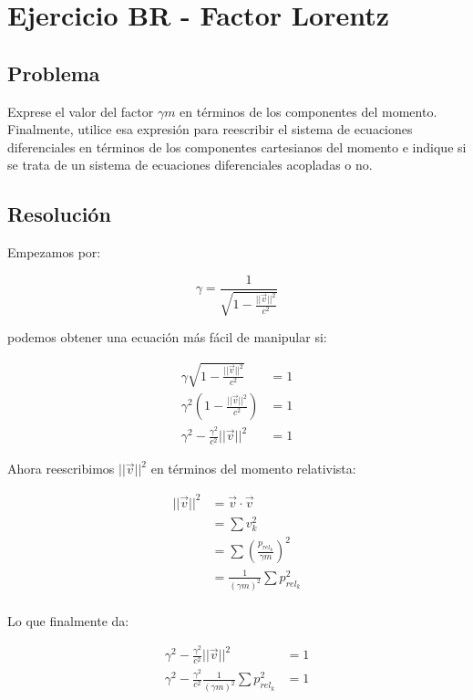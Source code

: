 \section{Ejercicio BR - Factor Lorentz}

\subsection{Problema}
Exprese el valor del factor $\gamma m$ en términos de los componentes del momento. Finalmente, utilice esa expresión para reescribir el sistema de ecuaciones diferenciales en términos de los componentes cartesianos del momento e indique si se trata de un sistema de ecuaciones diferenciales acopladas o no.

\subsection{Resolución}

Empezamos por:

\begin{equation*}
	\gamma = 
\frac{1}{
	\sqrt{
	1 - \frac{|| \vec{v} ||^2} {c^2}	
}
}
\end{equation*}

podemos obtener una ecuación más fácil de manipular si:

\begin{align*}
	\gamma \sqrt{ 1 -  \frac{||\vec{v}||^2}{c^2}} &= 1 \\
	\gamma^2 (1 - \frac{||\vec{v}||^2}{c^2}) &= 1 \\
	\gamma ^2 - \frac{\gamma^2}{c^2} || \vec{v} ||^2 & =1
\end{align*}

Ahora reescribimos $||\vec{v}||^2$ en términos del momento relativista:

\begin{align*}
|| \vec{v} ||^2 
	&= \vec{v}\cdot \vec{v} \\
	&= \sum v_k^2 \\
	&= \sum (\frac{p_{rel_k}}{\gamma m})^2 \\
	&= \frac{1}{(\gamma m)^2} \sum p_{rel_k}^2 \\
\end{align*} 

Lo que finalmente da:

\begin{align*}
\gamma ^2 - \frac{\gamma^2}{c^2} || \vec{v} ||^2  &= 1 \\
\gamma ^2 - \frac{\gamma^2}{c^2} \frac{1}{(\gamma m)^2} \sum p_{rel_k}^2  &= 1
\end{align*}

